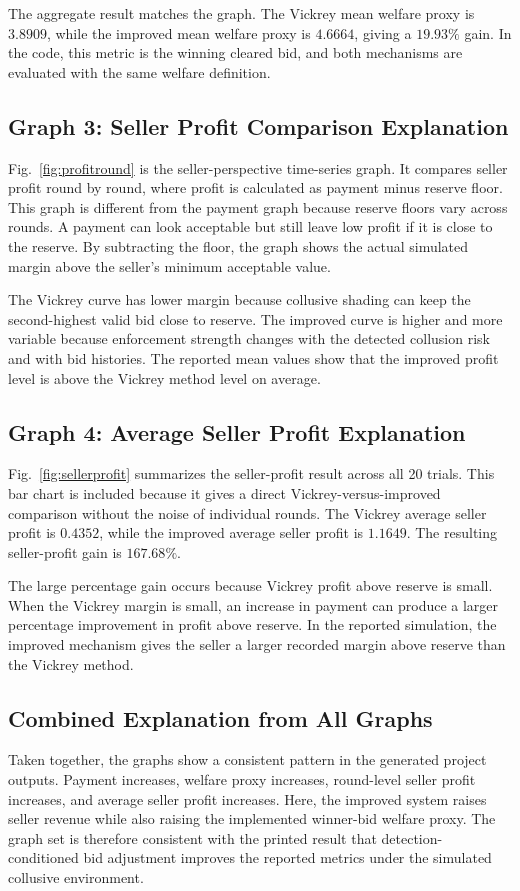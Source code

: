 \documentclass[conference]{IEEEtran}
\begin{document}
The aggregate result matches the graph. The Vickrey mean welfare proxy is $3.8909$, while the improved mean welfare proxy is $4.6664$, giving a $19.93\%$ gain. In the code, this metric is the winning cleared bid, and both mechanisms are evaluated with the same welfare definition.

\subsection{Graph 3: Seller Profit Comparison Explanation}
Fig.~\ref{fig:profitround} is the seller-perspective time-series graph. It compares seller profit round by round, where profit is calculated as payment minus reserve floor. This graph is different from the payment graph because reserve floors vary across rounds. A payment can look acceptable but still leave low profit if it is close to the reserve. By subtracting the floor, the graph shows the actual simulated margin above the seller's minimum acceptable value.

The Vickrey curve has lower margin because collusive shading can keep the second-highest valid bid close to reserve. The improved curve is higher and more variable because enforcement strength changes with the detected collusion risk and with bid histories. The reported mean values show that the improved profit level is above the Vickrey method level on average.

\subsection{Graph 4: Average Seller Profit Explanation}
Fig.~\ref{fig:sellerprofit} summarizes the seller-profit result across all 20 trials. This bar chart is included because it gives a direct Vickrey-versus-improved comparison without the noise of individual rounds. The Vickrey average seller profit is $0.4352$, while the improved average seller profit is $1.1649$. The resulting seller-profit gain is $167.68\%$.

The large percentage gain occurs because Vickrey profit above reserve is small. When the Vickrey margin is small, an increase in payment can produce a larger percentage improvement in profit above reserve. In the reported simulation, the improved mechanism gives the seller a larger recorded margin above reserve than the Vickrey method.

\subsection{Combined Explanation from All Graphs}
Taken together, the graphs show a consistent pattern in the generated project outputs. Payment increases, welfare proxy increases, round-level seller profit increases, and average seller profit increases. Here, the improved system raises seller revenue while also raising the implemented winner-bid welfare proxy. The graph set is therefore consistent with the printed result that detection-conditioned bid adjustment improves the reported metrics under the simulated collusive environment.
\end{document}
